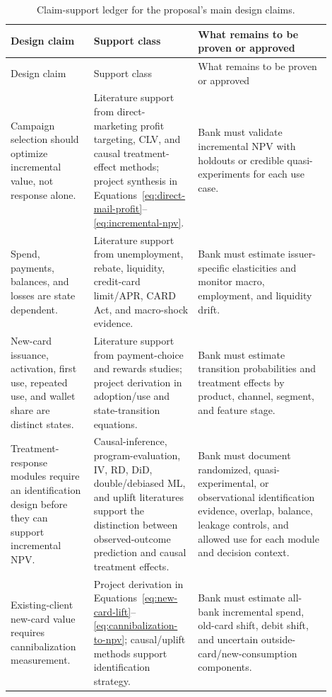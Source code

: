 \documentclass[11pt]{article}
\newcommand{\1}{\mathbf{1}}
\begin{document}
\begin{longtable}{p{0.25\linewidth}p{0.25\linewidth}p{0.40\linewidth}}
\caption{Claim-support ledger for the proposal's main design claims.}
\label{tab:claim-support}\\
\toprule
Design claim & Support class & What remains to be proven or approved \\
\midrule
\endfirsthead
\toprule
Design claim & Support class & What remains to be proven or approved \\
\midrule
\endhead
Campaign selection should optimize incremental value, not response alone.
  & Literature support from direct-marketing profit targeting, CLV, and causal
    treatment-effect methods; project synthesis in
    Equations~\eqref{eq:direct-mail-profit}--\eqref{eq:incremental-npv}.
  & Bank must validate incremental NPV with holdouts or credible
    quasi-experiments for each use case. \\
Spend, payments, balances, and losses are state dependent.
  & Literature support from unemployment, rebate, liquidity, credit-card
    limit/APR, CARD Act, and macro-shock evidence.
  & Bank must estimate issuer-specific elasticities and monitor macro,
    employment, and liquidity drift. \\
New-card issuance, activation, first use, repeated use, and wallet share are
distinct states.
  & Literature support from payment-choice and rewards studies; project
    derivation in adoption/use and state-transition equations.
  & Bank must estimate transition probabilities and treatment effects by
    product, channel, segment, and feature stage. \\
Treatment-response modules require an identification design before they can
support incremental NPV.
  & Causal-inference, program-evaluation, IV, RD, DiD, double/debiased ML, and
    uplift literatures support the distinction between observed-outcome
    prediction and causal treatment effects.
  & Bank must document randomized, quasi-experimental, or observational
    identification evidence, overlap, balance, leakage controls, and allowed
    use for each module and decision context. \\
Existing-client new-card value requires cannibalization measurement.
  & Project derivation in
    Equations~\eqref{eq:new-card-lift}--\eqref{eq:cannibalization-to-npv};
    causal/uplift methods support identification strategy.
  & Bank must estimate all-bank incremental spend, old-card shift, debit shift,
    and uncertain outside-card/new-consumption components. \\

\end{longtable}
\end{document}
